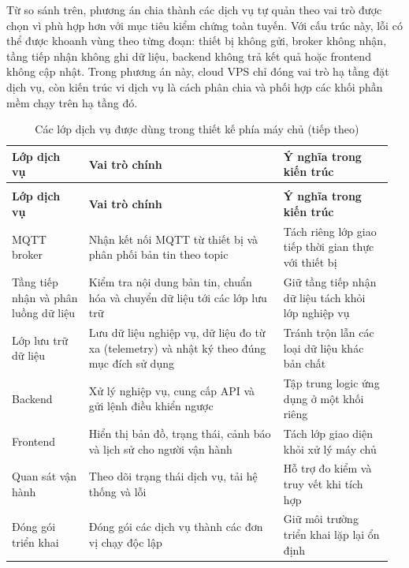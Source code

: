 \documentclass[a4paper]{extarticle}
\newcommand{\thesissettableid}[2]{%
  \renewcommand{\thetable}{#1}%
  \renewcommand{\theHtable}{#2}%
}
\begin{document}
Từ so sánh trên, phương án chia thành các dịch vụ tự quản theo vai trò được
chọn vì phù hợp hơn với mục tiêu kiểm chứng toàn tuyến. Với cấu trúc này, lỗi
có thể được khoanh vùng theo từng đoạn: thiết bị không gửi, broker không nhận,
tầng tiếp nhận không ghi dữ liệu, backend không trả kết quả hoặc frontend không
cập nhật. Trong phương án này, cloud VPS chỉ đóng vai trò hạ tầng đặt dịch vụ,
còn kiến trúc vi dịch vụ là cách phân chia và phối hợp các khối phần mềm chạy
trên hạ tầng đó.

{\thesissettableid{3.22}{condensed-bang-3-22-cac-lop-dich-vu-duoc-dung-trong-thiet-ke-phia-may-chu}
\def\LTcaptype{table}
\begin{longtable}{|L{0.198\linewidth}|L{0.486\linewidth}|L{0.275\linewidth}|}
\caption{Các lớp dịch vụ được dùng trong thiết kế phía máy chủ}\label{tab:condensed-bang-3-22-cac-lop-dich-vu-duoc-dung-trong-thiet-ke-phia-may-chu}\\
\hline
\textbf{Lớp dịch vụ} & \textbf{Vai trò chính} & \textbf{Ý nghĩa trong kiến trúc} \\
\hline
\endfirsthead
\caption[]{Các lớp dịch vụ được dùng trong thiết kế phía máy chủ (tiếp theo)}\\
\hline
\textbf{Lớp dịch vụ} & \textbf{Vai trò chính} & \textbf{Ý nghĩa trong kiến trúc} \\
\hline
\endhead
\endfoot
\endlastfoot
MQTT broker & Nhận kết nối MQTT từ thiết bị và phân phối bản tin theo topic & Tách riêng lớp giao tiếp thời gian thực với thiết bị \\\hline
Tầng tiếp nhận và phân luồng dữ liệu & Kiểm tra nội dung bản tin, chuẩn hóa và chuyển dữ liệu tới các lớp lưu trữ & Giữ tầng tiếp nhận dữ liệu tách khỏi lớp nghiệp vụ \\\hline
Lớp lưu trữ dữ liệu & Lưu dữ liệu nghiệp vụ, dữ liệu đo từ xa (telemetry) và nhật ký theo đúng mục đích sử dụng & Tránh trộn lẫn các loại dữ liệu khác bản chất \\\hline
Backend & Xử lý nghiệp vụ, cung cấp API và gửi lệnh điều khiển ngược & Tập trung logic ứng dụng ở một khối riêng \\\hline
Frontend & Hiển thị bản đồ, trạng thái, cảnh báo và lịch sử cho người vận hành & Tách lớp giao diện khỏi xử lý máy chủ \\\hline
Quan sát vận hành & Theo dõi trạng thái dịch vụ, tải hệ thống và lỗi & Hỗ trợ đo kiểm và truy vết khi tích hợp \\\hline
Đóng gói triển khai & Đóng gói các dịch vụ thành các đơn vị chạy độc lập & Giữ môi trường triển khai lặp lại ổn định \\\hline
\end{longtable}
}
\end{document}
